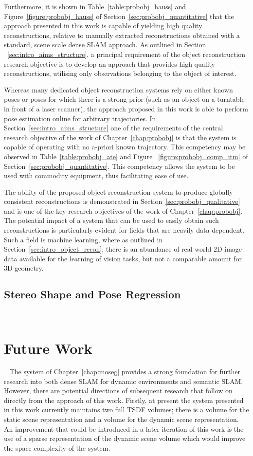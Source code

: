 Furthermore, it is shown in Table~\ref{table:probobj_hauss} and Figure~\ref{figure:probobj_hauss} 
of Section~\ref{sec:probobj_quantitative} that the approach presented in this work is capable of 
yielding high quality reconstructions, relative to manually extracted reconstructions obtained 
with a standard, scene scale dense SLAM approach. As outlined in Section
~\ref{sec:intro_aims_structure}, a principal requirement of the object reconstruction research 
objective is to develop an approach that provides high quality reconstructions, utilising only 
observations belonging to the object of interest.

Whereas many dedicated object reconstruction systems rely on either known poses or poses for which 
there is a strong prior (such as an object on a turntable in front of a laser scanner), the approach 
proposed in this work is able to perform pose estimation online for arbitrary trajectories. In 
Section~\ref{sec:intro_aims_structure} one of the requirements of the central research objective of 
the work of Chapter~\ref{chap:probobj} is that the system is capable of operating with no a-priori
known trajectory. This competency may be observed in Table~\ref{table:probobj_ate} and Figure
~\ref{figure:probobj_comp_itm} of Section~\ref{sec:probobj_quantitative}. This competency allows 
the system to be used with commodity equipment, thus facilitating ease of use.

The ability of the proposed object reconstruction system to produce globally consistent reconstructions 
is demonstrated in Section~\ref{sec:probobj_qualitative} and is one of the key research objectives of the 
work of Chapter~\ref{chap:probobj}. The potential impact of a system that can be used to easily obtain such 
reconstructions is particularly evident for fields that are heavily data dependent. Such a field is machine 
learning, where as outlined in Section~\ref{sec:intro_object_recon}, there is an abundance of real world 2D 
image data available for the learning of vision tasks, but not a comparable amount for 3D geometry.

\subsection{Stereo Shape and Pose Regression}
~\label{subsec:discussion_spp}

\section{Future Work}
~\label{sec:discussion_limitations}
The system of Chapter~\ref{chap:moseg} provides a strong foundation for further research 
into both dense SLAM for dynamic environments and semantic SLAM\@. However, there are 
potential directions of subsequent research that follow on directly from the approach of 
this work. Firstly, at present the system presented in this work currently maintains two full 
TSDF volumes; there is a volume for the static scene representation and a volume for the dynamic 
scene representation. An improvement that could be introduced in a later iteration of this work 
is the use of a sparse representation of the dynamic scene volume which would improve the space 
complexity of the system. 

